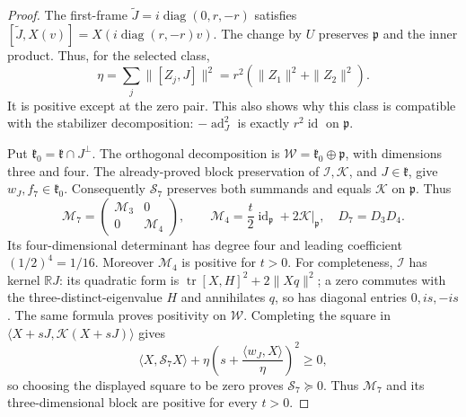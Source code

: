 \begin{proof}
The first-frame $\widetilde J=i\operatorname{diag}(0,r,-r)$ satisfies
$[\widetilde J,X(v)]=X(i\operatorname{diag}(r,-r)v)$.
The change by $U$ preserves $\mathfrak p$ and the inner product.
Thus, for the selected class,
\[
\eta=\sum_j\|[Z_j,J]\|^2
=r^2(\|Z_1\|^2+\|Z_2\|^2).
\]
It is positive except at the zero pair. This also shows why this class is
compatible with the stabilizer decomposition: $-\operatorname{ad}_J^2$
is exactly $r^2\operatorname{id}$ on $\mathfrak p$.

Put $\mathfrak k_0=\mathfrak k\cap J^\perp$. The orthogonal decomposition is
$\mathscr W=\mathfrak k_0\oplus\mathfrak p$, with dimensions three and four.
The already-proved block preservation of $\mathcal I,\mathcal K$,
and $J\in\mathfrak k$, give $w_J,f_7\in\mathfrak k_0$.
Consequently $\mathcal S_7$ preserves both summands and equals
$\mathcal K$ on $\mathfrak p$. Thus
\[
\mathscr M_7=\begin{pmatrix}\mathscr M_3&0\\0&\mathscr M_4\end{pmatrix},
\qquad \mathscr M_4=\frac t2\operatorname{id}_{\mathfrak p}+2\mathcal K|_{\mathfrak p},
\quad D_7=D_3D_4.
\]
Its four-dimensional determinant has degree four and leading coefficient
$(1/2)^4=1/16$. Moreover $\mathscr M_4$ is positive for $t>0$.
For completeness, $\mathcal I$ has kernel $\mathbb RJ$: its quadratic
form is $\operatorname{tr}[X,H]^2+2\|Xq\|^2$; a zero commutes with the
three-distinct-eigenvalue $H$ and annihilates $q$, so has diagonal
entries $0,is,-is$. The same formula proves positivity on $\mathscr W$.
Completing the square in $\langle X+sJ,\mathcal K(X+sJ)\rangle$ gives
\[
\langle X,\mathcal S_7X\rangle
+\eta\left(s+\frac{\langle w_J,X\rangle}{\eta}\right)^2\ge0,
\]
so choosing the displayed square to be zero proves
$\mathcal S_7\succeq0$. Thus $\mathscr M_7$ and its three-dimensional
block are positive for every $t>0$.


\end{proof}
